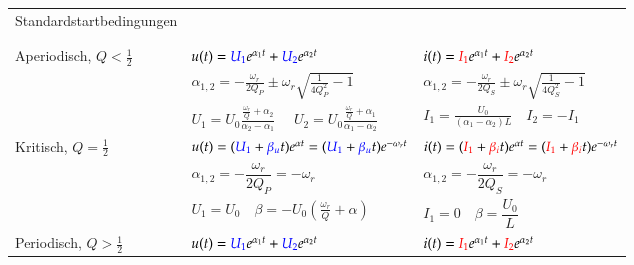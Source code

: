 \begin{tabular}{| p{4cm} | p{7cm} | p{7cm} |}
	Standardstartbedingungen &
	\begin{minipage}{7cm}
    	\vspace{0.1cm}
    	$u(t=0)=U_0$\quad
    	$\dot{u}(t=0)=-\dfrac{U_o}{RC}$ \\
    \end{minipage} &
	\begin{minipage}{7cm}
     	\vspace{0.1cm}
    	$i(t=0)=0$\quad
    	$\dot{i}(t=0)=\dfrac{U_o}{L}$\\   
    \end{minipage}\\
	\hline
	Aperiodisch, $ Q < \frac{1}{2}$
		& $u(t) = \textcolor{blue}{U_1} e^{\alpha_1 t} + \textcolor{blue}{U_2} e^{\alpha_2 t}$ 
		& $i(t) = \textcolor{red}{I_1} e^{\alpha_1 t} + \textcolor{red}{I_2} e^{\alpha_2 t}$ \\
		& $\alpha_{1,2} = - \frac{\omega_r}{2 Q_P} \pm \omega_r \sqrt{\frac{1}{4 Q_P^2} - 1}$	
		& $\alpha_{1,2} = - \frac{\omega_r}{2 Q_S} \pm \omega_r \sqrt{\frac{1}{4Q_S^2} - 1}$\\
		& $U_1 = U_0 \frac{\frac{\omega_r}{Q} +
		\alpha_2}{\alpha_2 - \alpha_1} \quad$ $U_2 = U_0 \frac{\frac{\omega_r}{Q} +
		\alpha_1}{\alpha_1 - \alpha_2}$
		& $I_1 = \frac{U_0}{(\alpha_1 - \alpha_2)L} \quad I_2
		= -I_1$
		\vspace{0.1cm}
		\\
	\hline 	
	Kritisch, $ Q = \frac{1}{2}$
		& $u(t) = (\textcolor{blue}{U_1} + \textcolor{blue}{\beta_u} t) 
		e^{\alpha t} = (\textcolor{blue}{U_1} + \textcolor{blue}{\beta_u} t) 
		e^{- \omega_r t}$ 
		& $i(t) = (\textcolor{red}{I_1} + \textcolor{red}{\beta_i} t) 
		e^{\alpha t} = (\textcolor{red}{I_1} + \textcolor{red}{\beta_i} t) 
		e^{- \omega_r t}$ \\
		& $\alpha_{1,2} = - \dfrac{\omega_r}{2 Q_P} = - \omega_r$ & 
		$\alpha_{1,2} = - \dfrac{\omega_r}{2 Q_S} = - \omega_r$\\
		& $U_1 = U_0 \quad \beta = -U_0 \left(
		\frac{\omega_r}{Q}+\alpha \right)$ & 
		$I_1 = 0 \quad \beta = \dfrac{U_0}{L}$
		\vspace{0.1cm}
		\\
	\hline 	
	Periodisch, $ Q > \frac{1}{2}$
		& $u(t) = \textcolor{blue}{U_1} e^{\alpha_1 t} + 
					\textcolor{blue}{U_2} e^{\alpha_2 t} $
		& $i(t) = \textcolor{red}{I_1} e^{\alpha_1 t} + 
					\textcolor{red}{I_2} e^{\alpha_2 t} $ \\

\end{tabular}
